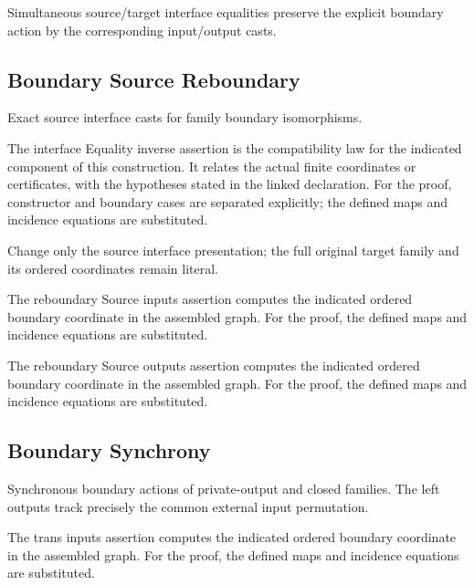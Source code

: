 Simultaneous source/target interface equalities preserve the explicit boundary action by the corresponding input/output casts.
\par{}

\subsection{Boundary Source Reboundary}
Exact source interface casts for family boundary isomorphisms.

The interface Equality inverse assertion is the compatibility law for the indicated component of this construction. It relates the actual finite coordinates or certificates, with the hypotheses stated in the linked declaration.
For the proof, constructor and boundary cases are separated explicitly; the defined maps and incidence equations are substituted.
\par{}

Change only the source interface presentation; the full original target family and its ordered coordinates remain literal.
\par{}

The reboundary Source inputs assertion computes the indicated ordered boundary coordinate in the assembled graph.
For the proof, the defined maps and incidence equations are substituted.
\par{}

The reboundary Source outputs assertion computes the indicated ordered boundary coordinate in the assembled graph.
For the proof, the defined maps and incidence equations are substituted.
\par{}

\subsection{Boundary Synchrony}
Synchronous boundary actions of private-output and closed families. The left outputs track precisely the common external input permutation.

The trans inputs assertion computes the indicated ordered boundary coordinate in the assembled graph.
For the proof, the defined maps and incidence equations are substituted.
\par{}

